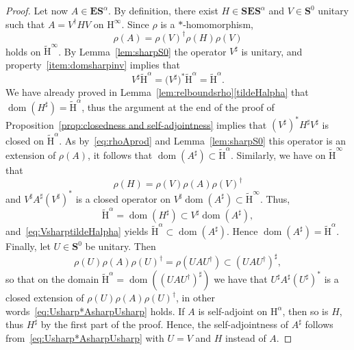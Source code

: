 \documentclass[AHL,Unicode,longabstracts,published]{cedram}
\DeclareMathOperator{\dom}{dom}
\renewcommand{\mathsf}{\mathrm}
\newcommand{\sfH}{\mathsf{H}}
\newcommand{\BE}{\mathbf E}
\newcommand{\BS}{\mathbf S}
\renewcommand{\subseteq}{\subset}
\begin{document}
\begin{proof}
Let now $A\in\BE\BS^\alpha$. By definition, there exist $H\in\BS\BE\BS^\alpha$ and $V\in\BS^0$ unitary such that $A=V^\dagger HV$ on $\sfH^\infty$. Since $\rho$ is a $*$-homomorphism,
\begin{equation}\label{eq:rhoAprod}
\rho(A)=\rho(V)^\dagger \rho(H)\rho(V)
\end{equation}
holds on $\widetilde{\sfH}^\infty$. By Lemma~\ref{lem:sharpS0} the operator $V^\sharp$ is unitary, and property~\eqref{item:domsharpinv} implies that
\begin{equation}\label{eq:VsharptildeHalpha}
V^\sharp \widetilde{\sfH}^\alpha= \big(V^\sharp\big)^*\widetilde{\sfH}^\alpha=\widetilde{\sfH}^\alpha.
\end{equation}
We have already proved in Lemma~\ref{lem:relboundsrho}\eqref{tildeHalpha} that $\dom(H^\sharp)=\widetilde{\sfH}^\alpha$, thus the argument at the end of the proof of Proposition~\ref{prop:closedness and self-adjointness} implies that $(V^\sharp)^\ast H^\sharp V^\sharp$ is closed on $\widetilde{\sfH}^\alpha$. As by~\eqref{eq:rhoAprod} and Lemma~\ref{lem:sharpS0} this operator is an extension of $\rho(A)$, it follows that $\dom(A^\sharp)\subseteq\widetilde{\sfH}^\alpha$. Similarly, we have on $\widetilde{\sfH}^\infty$ that
\begin{equation}
\rho(H)=\rho(V)\rho(A)\rho(V)^\dagger
\end{equation}
and $V^\sharp A^\sharp (V^\sharp)^*$ is a closed operator on $V^\sharp\dom(A^\sharp)\subseteq \widetilde{\sfH}^\infty$. Thus,
\[
\widetilde{\sfH}^\alpha=\dom\left(H^\sharp\right)\subseteq
V^\sharp\dom\left(A^\sharp\right),
\]
and~\eqref{eq:VsharptildeHalpha} yields $\widetilde{\sfH}^\alpha\subseteq\dom(A^\sharp)$. Hence $\dom(A^\sharp)=\widetilde{\sfH}^\alpha$. Finally, let $U\in\BS^0$ be unitary. Then
\begin{equation}
\rho(U)\rho(A)\rho(U)^\dagger=\rho\left(U A U^\dagger\right)\subseteq \left(U A U^\dagger\right)^\sharp,
\end{equation}
so that on the domain $\widetilde{\sfH}^\alpha=\dom((U A U^\dagger)^\sharp)$ we have that $U^\sharp A^\sharp(U^\sharp)^*$ is a closed extension of $\rho(U) \rho(A)\rho(U)^\dagger$, in other words~\eqref{eq:Usharp*AsharpUsharp} holds. If $A$ is self-adjoint on $\sfH^\alpha$, then so is $H$, thus $H^\sharp$ by the first part of the proof. Hence, the self-adjointness of $A^\sharp$ follows from~\eqref{eq:Usharp*AsharpUsharp} with $U=V$ and $H$ instead of $A$.
\end{proof}
\end{document}
